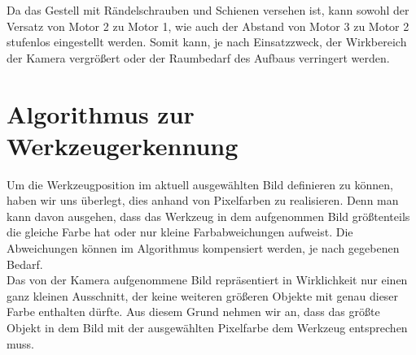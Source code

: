 \documentclass[12pt,a4paper,bibliography=totocnumbered,listof=totocnumbered]{scrartcl}
\begin{document}
Da das Gestell mit Rändelschrauben und Schienen versehen ist, kann sowohl der Versatz von Motor 2 zu Motor 1, wie auch der Abstand von Motor 3 zu Motor 2 stufenlos eingestellt werden. Somit kann, je nach Einsatzzweck, der Wirkbereich der Kamera vergrößert oder der Raumbedarf des Aufbaus verringert werden.

\section{Algorithmus zur Werkzeugerkennung}

Um die Werkzeugposition im aktuell ausgewählten Bild definieren zu können, haben wir uns überlegt, dies anhand von Pixelfarben zu realisieren. Denn man kann davon ausgehen, dass das Werkzeug in dem aufgenommen Bild größtenteils die gleiche Farbe hat oder nur kleine Farbabweichungen aufweist. Die Abweichungen können im Algorithmus kompensiert werden, je nach gegebenen Bedarf. \\  
Das von der Kamera aufgenommene Bild repräsentiert in Wirklichkeit nur einen ganz kleinen Ausschnitt, der keine weiteren größeren Objekte mit genau dieser Farbe enthalten dürfte. Aus diesem Grund nehmen wir an, dass das größte Objekt in dem Bild mit der ausgewählten Pixelfarbe dem Werkzeug entsprechen muss.
\end{document}
